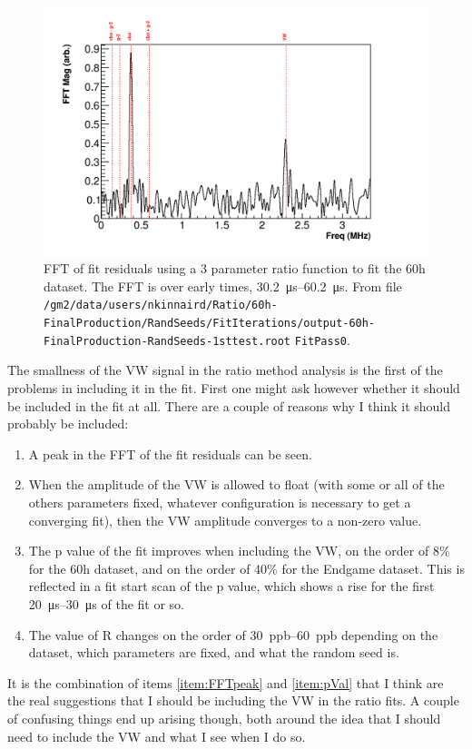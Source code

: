 \documentclass[12pt,letterpaper]{report}
\begin{document}
\begin{figure}[]
    \centering
    \includegraphics[width=\textwidth]{FFT_3param_earlyTimes}
    \caption[]{FFT of fit residuals using a 3 parameter ratio function to fit the 60h dataset. The FFT is over early times, \SIrange{30.2}{60.2}{\micro s}. From file \texttt{/gm2/data/users/nkinnaird/Ratio/60h-FinalProduction/RandSeeds/FitIterations/output-60h-FinalProduction-RandSeeds-1sttest.root} \texttt{FitPass0}.}
    \label{fig:FFT_3param_earlyTimes}
\end{figure}


The smallness of the VW signal in the ratio method analysis is the first of the problems in including it in the fit. First one might ask however whether it should be included in the fit at all. There are a couple of reasons why I think it should probably be included:
\begin{enumerate}
	\item\label{item:FFTpeak}{A peak in the FFT of the fit residuals can be seen.}
	\item\label{item:VWamp}{When the amplitude of the VW is allowed to float (with some or all of the others parameters fixed, whatever configuration is necessary to get a converging fit), then the VW amplitude converges to a non-zero value.}
	\item\label{item:pVal}{The p value of the fit improves when including the VW, on the order of 8\% for the 60h dataset, and on the order of 40\% for the Endgame dataset. This is reflected in a fit start scan of the p value, which shows a rise for the first \SIrange{20}{30}{\micro s} of the fit or so.}
	\item\label{item:Rchange}{The value of R changes on the order of \SIrange{30}{60}{ppb} depending on the dataset, which parameters are fixed, and what the random seed is.}
\end{enumerate}
It is the combination of items \ref{item:FFTpeak} and \ref{item:pVal} that I think are the real suggestions that I should be including the VW in the ratio fits. A couple of confusing things end up arising though, both around the idea that I should need to include the VW and what I see when I do so.
\end{document}
